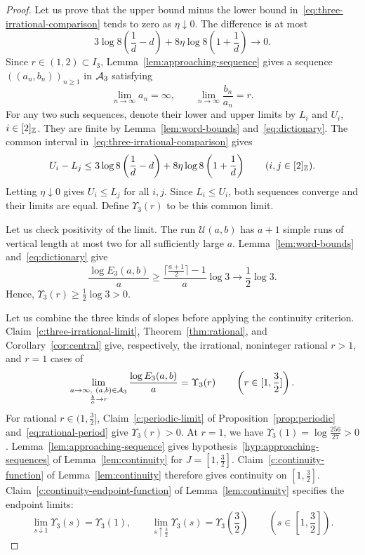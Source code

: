 \begin{proof}
Let us prove that the upper bound minus the lower bound in~\eqref{eq:three-irrational-comparison} tends to zero as $\eta\downarrow0$.
The difference is at most
\[
 3\log8\left(\frac1d-d\right)
 +8\eta\log8\left(1+\frac1d\right)
 \longrightarrow0.
\]
Since $r\in(1,2)\subset I_3$, Lemma~\ref{lem:approaching-sequence} gives a sequence $((a_n,b_n))_{n\ge1}$ in $\mathcal A_3$ satisfying
\[
 \lim_{n\to\infty}a_n=\infty,\qquad
 \lim_{n\to\infty}\frac{b_n}{a_n}=r.
\]
For any two such sequences, denote their lower and upper limits by $L_i$ and $U_i$, $i\in[2]_{\mathbb Z}$.
They are finite by Lemma~\ref{lem:word-bounds} and~\eqref{eq:dictionary}.
The common interval in~\eqref{eq:three-irrational-comparison} gives
\[
 U_i-L_j\le3\log8\left(\frac1d-d\right)
             +8\eta\log8\left(1+\frac1d\right)
 \qquad(i,j\in[2]_{\mathbb Z}).
\]
Letting $\eta\downarrow0$ gives $U_i\le L_j$ for all $i,j$.
Since $L_i\le U_i$, both sequences converge and their limits are equal.
Define $\Upsilon_3(r)$ to be this common limit.

Let us check positivity of the limit.
The run $\mathcal U(a,b)$ has $a+1$ simple runs of vertical length at most two for all sufficiently large $a$.
Lemma~\ref{lem:word-bounds} and~\eqref{eq:dictionary} give
\[
 \frac{\log E_3(a,b)}a
 \ge\frac{\lceil\frac{a+1}{2}\rceil-1}{a}\log3
 \longrightarrow\frac12\log3.
\]
Hence, $\Upsilon_3(r)\ge\frac12\log3>0$.

 Let us combine the three kinds of slopes before applying the continuity criterion.
Claim~\ref{c:three-irrational-limit}, Theorem~\ref{thm:rational}, and Corollary~\ref{cor:central} give, respectively, the irrational, noninteger rational $r>1$, and $r=1$ cases of
\[
 \lim_{\substack{a\to\infty,\ (a,b)\in\cA_3\\\frac ba\to r}}
 \frac{\log E_3(a,b)}a=\Upsilon_3(r)
 \qquad\left(r\in[1,\frac32]\right).
\]
For rational $r\in(1,\frac32]$, Claim~\ref{c:periodic-limit} of Proposition~\ref{prop:periodic} and~\eqref{eq:rational-period} give $\Upsilon_3(r)>0$.
At $r=1$, we have $\Upsilon_3(1)=\log\frac{256}{27}>0$.
Lemma~\ref{lem:approaching-sequence} gives hypothesis~\ref{hyp:approaching-sequences} of Lemma~\ref{lem:continuity} for $J=[1,\frac32]$.
Claim~\ref{c:continuity-function} of Lemma~\ref{lem:continuity} therefore gives continuity on $[1,\frac32]$.
Claim~\ref{c:continuity-endpoint-function} of Lemma~\ref{lem:continuity} specifies the endpoint limits:
\[
 \lim_{s\downarrow1}\Upsilon_3(s)=\Upsilon_3(1),\qquad
 \lim_{s\uparrow\frac32}\Upsilon_3(s)=\Upsilon_3\left(\frac32\right)
 \qquad\left(s\in\left[1,\frac32\right]\right).
\]
\end{proof}


